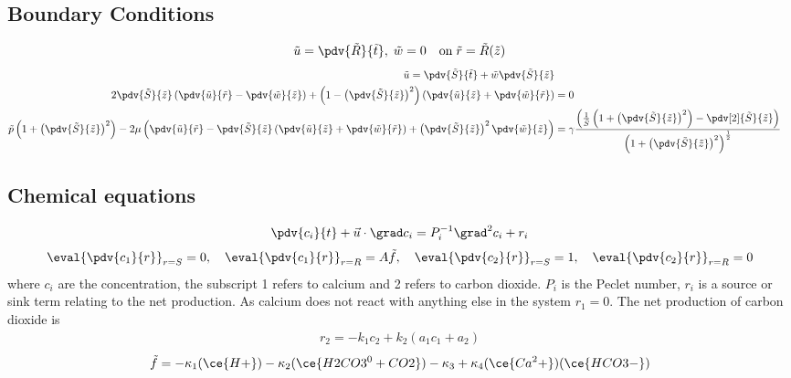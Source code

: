 \documentclass[12pt]{article}
\begin{document}
\subsection{Boundary Conditions}
\begin{align}
\tilde u=\pdv{\tilde R}{\tilde t},\;\tilde  w=0\quad\mathrm{on}\; \tilde r=\tilde R(\tilde z) 
\end{align}
\begin{align}
\tilde   u=\pdv{\tilde S}{\tilde t}+\tilde w\pdv{\tilde S}{\tilde z} \\
2\pdv{\tilde S}{\tilde z}\left(\pdv{\tilde u}{\tilde r}-\pdv{\tilde w}{\tilde z}\right)+\left(1-\left(\pdv{\tilde S}{\tilde z}\right)^2\right)\left(\pdv{\tilde u}{\tilde z}+\pdv{\tilde w}{\tilde r}\right)&=0\label{tangstress}\\
\tilde p\left(1+\left(\pdv{\tilde S}{\tilde z}\right)^2\right)-2\mu\left( \pdv{\tilde u}{\tilde r}-\pdv{\tilde S}{\tilde z}\left(\pdv{\tilde u}{\tilde z}+\pdv{\tilde w}{\tilde r}\right)+\left(\pdv{\tilde S}{\tilde z}\right)^2\pdv{\tilde w}{\tilde z}\right)&=\gamma\frac{\left(\frac{1}{\tilde S}\left(1+\left(\pdv{\tilde S}{\tilde z}\right)^2\right)-\pdv[2]{\tilde S}{\tilde z}\right)}{\left(1+\left(\pdv{\tilde S}{\tilde z}\right)^2\right)^{\frac{1}{2}}}\label{normstress}
\end{align}
\subsection{Chemical equations}
\begin{align}
\pdv{c_i}{t}+\vec{u}\cdot\grad c_i = P_i^{-1}\grad^2 c_i+r_i
\end{align} 
\begin{align}
\eval{\pdv{c_1}{r}}_{r=S} = 0,\quad \eval{\pdv{c_1}{r}}_{r=R} =A\tilde{f},\quad \eval{\pdv{c_2}{r}}_{r=S}=1,\quad \eval{\pdv{c_2}{r}}_{r=R}=0
\end{align}
where $c_i$ are the concentration, the subscript 1 refers to calcium and 2 refers to carbon dioxide. $P_i$ is the Peclet number, $r_i$ is a source or sink term relating to the net production. As calcium does not react with anything else in the system $r_1=0$. The net production of carbon dioxide is 
\begin{align}
r_2 = -k_1c_2+k_2(a_1c_1+a_2)
\end{align}
\begin{align}
\tilde{f} = -\kappa_1(\ce{H+})-\kappa_2(\ce{H2CO3^0 + CO2})-\kappa_3+\kappa_4(\ce{Ca^2+})(\ce{HCO3-})
\end{align}
\end{document}
